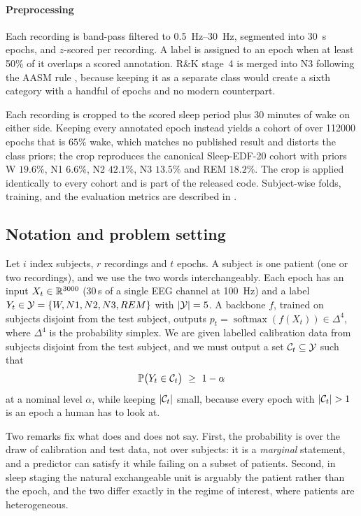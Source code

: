 \paragraph{Preprocessing}
Each recording is band-pass filtered to \SIrange{0.5}{30}{\hertz}, segmented
into \SI{30}{\second} epochs, and $z$-scored per recording. A label is
assigned to an epoch when at least 50\% of it overlaps a scored annotation.
R\&K stage~4 is merged into N3 following the AASM rule
\citep{berry2012manual}, because keeping it as a separate class would create a
sixth category with a handful of epochs and no modern counterpart.

Each recording is cropped to the scored sleep period plus 30 minutes of wake
on either side. Keeping every annotated epoch instead yields a cohort of over
\num{112000} epochs that is $65\%$ wake, which matches no published
result and distorts the class priors; the crop reproduces the canonical
Sleep-EDF-20 cohort with priors W $19.6\%$, N1 $6.6\%$, N2
$42.1\%$, N3 $13.5\%$ and REM $18.2\%$. The crop is applied
identically to every cohort and is part of the released code. Subject-wise
folds, training, and the evaluation metrics are described in
.

\subsection{Notation and problem setting}
\label{sec:notation}

Let $i$ index subjects, $r$ recordings and $t$ epochs. A subject is one
patient (one or two recordings), and we use the two words interchangeably.
Each epoch has an input
$X_t\in\mathbb{R}^{3000}$ (30\,s of a single EEG channel at \SI{100}{\hertz}) and a
label $Y_t\in\mathcal{Y}=\{W,N1,N2,N3,REM\}$ with $|\mathcal{Y}|=5$. A backbone $f$, trained
on subjects disjoint from the test subject, outputs
$p_t=\operatorname{softmax}(f(X_t))\in\Delta^{4}$, where $\Delta^4$ is the
probability simplex. We are given labelled calibration data from subjects
disjoint from the test subject, and we must output a set
$\mathcal{C}_t\subseteq\mathcal{Y}$ such that
\begin{equation}
\mathbb{P}\big(Y_t\in\mathcal{C}_t\big)\ \ge\ 1-\alpha
\label{eq:coverage}
\end{equation}
at a nominal level $\alpha$, while keeping $|\mathcal{C}_t|$ small, because every
epoch with $|\cC_t|>1$ is an epoch a human has to look at.

Two remarks fix what  does and does not say. First, the
probability is over the draw of calibration and test data, not over
subjects: it is a \emph{marginal} statement, and a predictor can satisfy it
while failing on a subset of patients. Second, in sleep staging the
natural exchangeable unit is arguably the patient rather than the epoch,
and the two differ exactly in the regime of interest, where patients are
heterogeneous.

